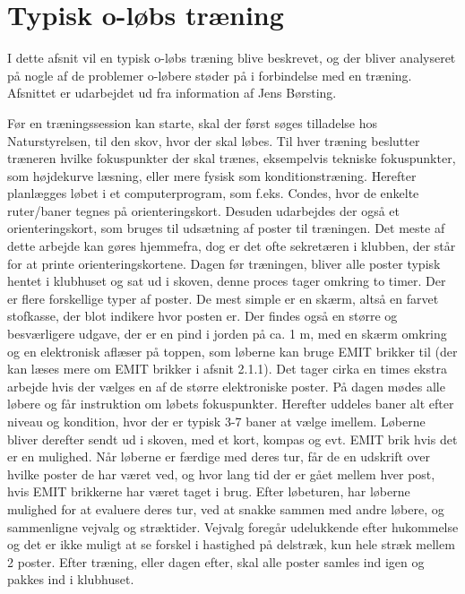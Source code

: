 \section{Typisk o-løbs træning}
I dette afsnit vil en typisk o-løbs træning blive beskrevet, og der bliver analyseret på nogle af de problemer o-løbere støder på i forbindelse med en træning. Afsnittet er udarbejdet ud fra information af Jens Børsting.

Før en træningssession kan starte, skal der først søges tilladelse hos Naturstyrelsen, til den skov, hvor der skal løbes. \newline
Til hver træning beslutter træneren hvilke fokuspunkter der skal trænes, eksempelvis tekniske fokuspunkter, som højdekurve læsning, eller mere fysisk som konditionstræning. Herefter planlægges løbet i et computerprogram, som f.eks. Condes, hvor de enkelte ruter/baner tegnes på orienteringskort. Desuden udarbejdes der også et orienteringskort, som bruges til udsætning af poster til træningen. Det meste af dette arbejde kan gøres hjemmefra, dog er det ofte sekretæren i klubben, der står for at printe orienteringskortene. Dagen før træningen, bliver alle poster typisk hentet i klubhuset og sat ud i skoven, denne proces tager omkring to timer. Der er flere forskellige typer af poster. De mest simple er en skærm, altså en farvet stofkasse, der blot indikere hvor posten er. Der findes også en større og besværligere udgave, der er en pind i jorden på ca. 1 m, med en skærm omkring og en elektronisk aflæser på toppen, som løberne kan bruge EMIT brikker til (der kan læses mere om EMIT brikker i afsnit 2.1.1). Det tager cirka en times ekstra arbejde hvis der vælges en af de større elektroniske poster.\newline
På dagen mødes alle løbere og får instruktion om løbets fokuspunkter. Herefter uddeles baner alt efter niveau og kondition, hvor der er typisk 3-7 baner at vælge imellem. Løberne bliver derefter sendt ud i skoven, med et kort, kompas og evt. EMIT brik hvis det er en mulighed. Når løberne er færdige med deres tur, får de en udskrift over hvilke poster de har været ved, og hvor lang tid der er gået mellem hver post, hvis EMIT brikkerne har været taget i brug.
Efter løbeturen, har løberne mulighed for at evaluere deres tur, ved at snakke sammen med andre løbere, og sammenligne vejvalg og stræktider. Vejvalg foregår udelukkende efter hukommelse og det er ikke muligt at se forskel i hastighed på delstræk, kun hele stræk mellem 2 poster. 
Efter træning, eller dagen efter, skal alle poster samles ind igen og pakkes ind i klubhuset.\newline

